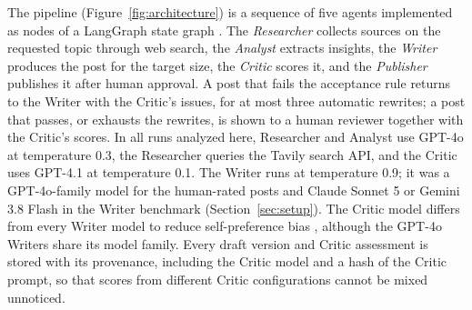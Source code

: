 \documentclass[a4paper,twoside]{article}
\begin{document}
The pipeline (Figure~\ref{fig:architecture}) is a sequence of five agents implemented as nodes of a LangGraph state graph \cite{langgraph}. The \emph{Researcher} collects sources on the requested topic through web search, the \emph{Analyst} extracts insights, the \emph{Writer} produces the post for the target size, the \emph{Critic} scores it, and the \emph{Publisher} publishes it after human approval. A post that fails the acceptance rule returns to the Writer with the Critic's issues, for at most three automatic rewrites; a post that passes, or exhausts the rewrites, is shown to a human reviewer together with the Critic's scores. In all runs analyzed here, Researcher and Analyst use GPT-4o at temperature 0.3, the Researcher queries the Tavily search API, and the Critic uses GPT-4.1 at temperature 0.1. The Writer runs at temperature 0.9; it was a GPT-4o-family model for the human-rated posts and Claude Sonnet 5 or Gemini 3.8 Flash in the Writer benchmark (Section~\ref{sec:setup}). The Critic model differs from every Writer model to reduce self-preference bias \cite{panickssery2024llm}, although the GPT-4o Writers share its model family. Every draft version and Critic assessment is stored with its provenance, including the Critic model and a hash of the Critic prompt, so that scores from different Critic configurations cannot be mixed unnoticed.
\end{document}
